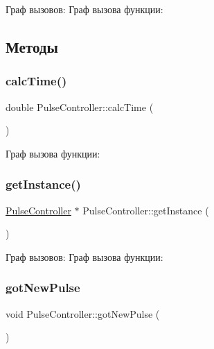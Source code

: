 Граф вызовов\+:
Граф вызова функции\+:


\subsection{Методы}
\mbox{\label{class_pulse_controller_aad89e956185b04ed12bd02056e4df743}} 
\subsubsection{\texorpdfstring{calc\+Time()}{calcTime()}}
{\footnotesize\ttfamily double Pulse\+Controller\+::calc\+Time (\begin{DoxyParamCaption}{ }\end{DoxyParamCaption})}

Граф вызова функции\+:
\mbox{\label{class_pulse_controller_ac7e6d3cb62727c89da948551d4cdce01}} 
\subsubsection{\texorpdfstring{get\+Instance()}{getInstance()}}
{\footnotesize\ttfamily \hyperlink{class_pulse_controller}{Pulse\+Controller} $\ast$ Pulse\+Controller\+::get\+Instance (\begin{DoxyParamCaption}{ }\end{DoxyParamCaption})\hspace{0.3cm}{\ttfamily [static]}}

Граф вызовов\+:
Граф вызова функции\+:
\mbox{\label{class_pulse_controller_ada3a07fc7a533e76d0d91e2e8c31e75e}} 
\subsubsection{\texorpdfstring{got\+New\+Pulse}{gotNewPulse}}
{\footnotesize\ttfamily void Pulse\+Controller\+::got\+New\+Pulse (\begin{DoxyParamCaption}{ }\end{DoxyParamCaption})\hspace{0.3cm}{\ttfamily [slot]}}


